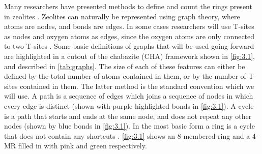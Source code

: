 \documentclass[preprint,numrefs,noinfo,sort&compress]{elsarticle}
\begin{document}
Many researchers have presented methods to define and count the rings present in zeolites \cite{guttman-ring-1990,goetzke-properties-1991,franzblau-computation-1991,yuan-efficient-2002-1,wooten-structure-2002,le-roux-ring-2010,sastre-zeotsites-2001}. Zeolites can naturally be represented using graph theory, where atoms are nodes, and bonds are edges. In some cases researchers will use T-sites as nodes and oxygen atoms as edges, since the oxygen atoms are only connected to two T-sites \cite{goetzke-properties-1991}. Some basic definitions of graphs that will be used going forward are highlighted in a cutout of the chabazite (CHA) framework shown in \cref{fig:3.1}, and described in \cref{tab:graphs}. The size of each of these features can either be defined by the total number of atoms contained in them, or by the number of T-sites contained in them. The latter method is the standard convention which we will use. A path is a sequence of edges which joins a sequence of nodes in which every edge is distinct (shown with purple highlighted bonds in \cref{fig:3.1}). A cycle is a path that starts and ends at the same node, and does not repeat any other nodes (shown by blue bonds in \cref{fig:3.1}). In the most basic form a ring is a cycle that does not contain any shortcuts \cite{guttman-ring-1990,goetzke-properties-1991}. \cref{fig:3.1} shows an 8-membered ring and a 4-MR filled in with pink and green respectively.  
\end{document}
